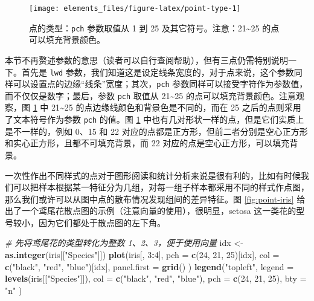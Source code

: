 \documentclass[
  b5paper,
  UTF8,twoside]{book}
\newenvironment{Shaded}{\begin{snugshade}}{\end{snugshade}}
\newcommand{\AttributeTok}[1]{\textcolor[rgb]{0.13,0.29,0.53}{#1}}
\newcommand{\CommentTok}[1]{\textcolor[rgb]{0.56,0.35,0.01}{\textit{#1}}}
\newcommand{\DecValTok}[1]{\textcolor[rgb]{0.00,0.00,0.81}{#1}}
\newcommand{\FunctionTok}[1]{\textcolor[rgb]{0.13,0.29,0.53}{\textbf{#1}}}
\newcommand{\NormalTok}[1]{#1}
\newcommand{\OtherTok}[1]{\textcolor[rgb]{0.56,0.35,0.01}{#1}}
\newcommand{\SpecialCharTok}[1]{\textcolor[rgb]{0.81,0.36,0.00}{\textbf{#1}}}
\newcommand{\StringTok}[1]{\textcolor[rgb]{0.31,0.60,0.02}{#1}}
\begin{document}
\begin{figure}

{\centering \texttt{[image: elements\_files/figure-latex/point-type-1]} 

}

\caption[点的类型：\texttt{pch} 参数取值从 0 到 25 及其它符号]{点的类型：\texttt{pch} 参数取值从 1 到 25 及其它符号。注意：21\textasciitilde25 的点可以填充背景颜色。}\label{fig:point-type}
\end{figure}





本节不再赘述参数的意思（读者可以自行查阅帮助），但有三点仍需特别说明一下。首先是 \texttt{lwd} 参数，我们知道这是设定线条宽度的，对于点来说，这个参数同样可以设置点的边缘``线条''宽度；其次，\texttt{pch} 参数同样可以接受字符作为参数值，而不仅仅是数字；最后，参数 \texttt{pch} 取值从 21\textasciitilde25 的点可以填充背景颜色。注意观察，图 \ref{fig:point-type} 中 21\textasciitilde25 的点边缘线颜色和背景色是不同的，而在 25 之后的点则采用了文本符号作为参数 \texttt{pch} 的值。图 \ref{fig:point-type} 中也有几对形状一样的点，但是它们实质上是不一样的，例如 0、15 和 22 对应的点都是正方形，但前二者分别是空心正方形和实心正方形，且都不可填充背景，而 22 对应的点是空心正方形，可以填充背景。

一次性作出不同样式的点对于图形阅读和统计分析来说是很有利的，比如有时候我们可以把样本根据某一特征分为几组，对每一组子样本都采用不同的样式作点图，那么我们或许可以从图中点的散布情况发现组间的差异特征。图 \ref{fig:point-iris} 给出了一个鸢尾花散点图的示例（注意向量的使用），很明显，setosa 这一类花的型号较小，因为它们都处于散点图的左下角。

\begin{Shaded}
\begin{Highlighting}[]
\CommentTok{\# 先将鸢尾花的类型转化为整数 1、2、3，便于使用向量}
\NormalTok{idx }\OtherTok{\textless{}{-}} \FunctionTok{as.integer}\NormalTok{(iris[[}\StringTok{"Species"}\NormalTok{]])}
\FunctionTok{plot}\NormalTok{(iris[, }\DecValTok{3}\SpecialCharTok{:}\DecValTok{4}\NormalTok{],}
  \AttributeTok{pch =} \FunctionTok{c}\NormalTok{(}\DecValTok{24}\NormalTok{, }\DecValTok{21}\NormalTok{, }\DecValTok{25}\NormalTok{)[idx],}
  \AttributeTok{col =} \FunctionTok{c}\NormalTok{(}\StringTok{"black"}\NormalTok{, }\StringTok{"red"}\NormalTok{, }\StringTok{"blue"}\NormalTok{)[idx], }\AttributeTok{panel.first =} \FunctionTok{grid}\NormalTok{()}
\NormalTok{)}
\FunctionTok{legend}\NormalTok{(}\StringTok{"topleft"}\NormalTok{,}
  \AttributeTok{legend =} \FunctionTok{levels}\NormalTok{(iris[[}\StringTok{"Species"}\NormalTok{]]),}
  \AttributeTok{col =} \FunctionTok{c}\NormalTok{(}\StringTok{"black"}\NormalTok{, }\StringTok{"red"}\NormalTok{, }\StringTok{"blue"}\NormalTok{), }\AttributeTok{pch =} \FunctionTok{c}\NormalTok{(}\DecValTok{24}\NormalTok{, }\DecValTok{21}\NormalTok{, }\DecValTok{25}\NormalTok{), }\AttributeTok{bty =} \StringTok{"n"}
\NormalTok{)}
\end{Highlighting}
\end{Shaded}
\end{document}
